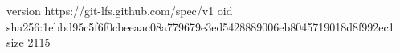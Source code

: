 version https://git-lfs.github.com/spec/v1
oid sha256:1ebbd95c5f6f0cbeeaac08a779679e3ed5428889006eb8045719018d8f992ec1
size 2115
